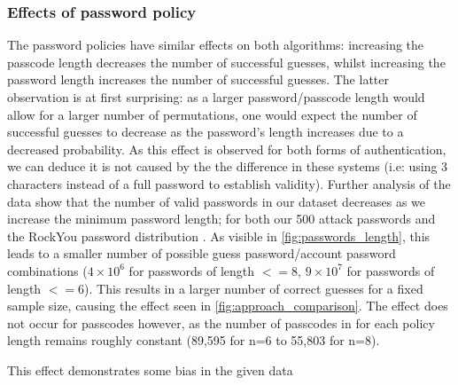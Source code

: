 \documentclass[british,10pt,a4paper]{article}
\begin{document}
\subsubsection{Effects of password policy}
The password policies have similar effects on both algorithms: increasing the passcode length decreases the number of successful guesses, whilst increasing the password length increases the number of successful guesses. The latter observation is at first surprising: as a larger password/passcode length would allow for a larger number of permutations, one would expect the number of successful guesses to decrease as the password's length increases due to a decreased probability. As this effect is observed for both forms of authentication, we can deduce it is not caused by the the difference in these systems (i.e: using 3 characters instead of a full password to establish validity). Further analysis of the data show that the number of valid passwords in our dataset decreases as we increase the minimum password length; for both our 500 attack passwords and the RockYou password distribution \cite{rockyoupasswords}. As visible in \autoref{fig:passwords_length}, this leads to a smaller number of possible guess password/account password combinations ($4 \times 10^6 $ for  passwords  of length $<= 8$, $9 \times 10^7$ for passwords of length $<= 6$). This results in a larger number of correct guesses for a fixed sample size, causing the effect seen in \autoref{fig:approach_comparison}. The effect does not occur for passcodes however, as the number of passcodes in \cite{rockyoupasswords} for each policy length remains roughly constant (89,595 for n=6 to 55,803 for n=8).

This effect demonstrates some bias in the given data 

\end{document}
